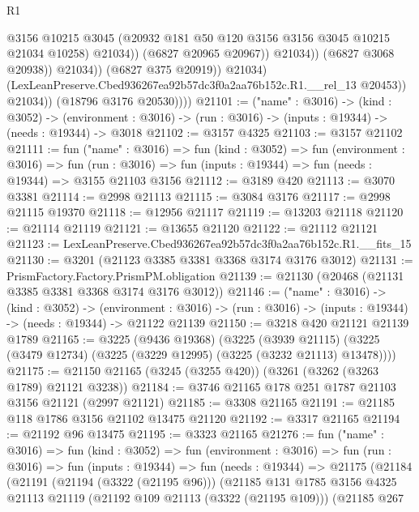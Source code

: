 \begin{lexlean}{R1}
\begin{coremodule}
                                    @3156
                                    @10215
                                    @3045
                                    (@20932 @181 @50 @120 @3156 @3156 @3045 @10215 @21034 @10258)
                                    @21034))
                                (@6827 @20965 @20967))
                              @21034))
                          (@6827 @3068 @20938))
                        @21034))
                    (@6827 @375 @20919))
                  @21034)
                (LexLeanPreserve.Cbed936267ea92b57dc3f0a2aa76b152c.R1.__rel_13 @20453))
              @21034))
          (@18796 @3176 @20530))))
@21101 := ("name" : @3016) ->
  (kind : @3052) ->
  (environment : @3016) -> (run : @3016) -> (inputs : @19344) -> (needs : @19344) -> @3018
@21102 := @3157 @4325
@21103 := @3157 @21102
@21111 := fun ("name" : @3016) =>
  fun (kind : @3052) =>
  fun (environment : @3016) =>
  fun (run : @3016) => fun (inputs : @19344) => fun (needs : @19344) => @3155 @21103 @3156
@21112 := @3189 @420
@21113 := @3070 @3381
@21114 := @2998 @21113
@21115 := @3084 @3176
@21117 := @2998 @21115 @19370
@21118 := @12956 @21117
@21119 := @13203 @21118
@21120 := @21114 @21119
@21121 := @13655 @21120
@21122 := @21112 @21121
@21123 := LexLeanPreserve.Cbed936267ea92b57dc3f0a2aa76b152c.R1.__fits_15
@21130 := @3201 (@21123 @3385 @3381 @3368 @3174 @3176 @3012)
@21131 := PrismFactory.Factory.PrismPM.obligation
@21139 := @21130 (@20468 (@21131 @3385 @3381 @3368 @3174 @3176 @3012))
@21146 := ("name" : @3016) ->
  (kind : @3052) ->
  (environment : @3016) -> (run : @3016) -> (inputs : @19344) -> (needs : @19344) -> @21122 @21139
@21150 := @3218 @420 @21121 @21139 @1789
@21165 := @3225
    (@9436 @19368)
    (@3225
      (@3939 @21115)
      (@3225 (@3479 @12734) (@3225 (@3229 @12995) (@3225 (@3232 @21113) @13478))))
@21175 := @21150 @21165 (@3245 (@3255 @420)) (@3261 (@3262 (@3263 @1789) @21121 @3238))
@21184 := @3746 @21165 @178 @251 @1787 @21103 @3156 @21121 (@2997 @21121)
@21185 := @3308 @21165
@21191 := @21185 @118 @1786 @3156 @21102 @13475 @21120
@21192 := @3317 @21165
@21194 := @21192 @96 @13475
@21195 := @3323 @21165
@21276 := fun ("name" : @3016) =>
  fun (kind : @3052) =>
  fun (environment : @3016) =>
  fun (run : @3016) =>
  fun (inputs : @19344) =>
  fun (needs : @19344) =>
  @21175
    (@21184
      (@21191
        (@21194 (@3322 (@21195 @96)))
        (@21185
          @131
          @1785
          @3156
          @4325
          @21113
          @21119
          (@21192 @109 @21113 (@3322 (@21195 @109)))
          (@21185
            @267

\end{coremodule}
\end{lexlean}

